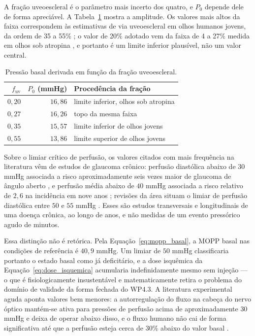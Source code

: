 A fração uveoescleral é o parâmetro mais incerto dos quatro, e $P_0$ depende dele de forma apreciável. A Tabela~\ref{tab:wp42_p0_fuv} mostra a amplitude. Os valores mais altos da faixa correspondem às estimativas de via uveoescleral em olhos humanos jovens, da ordem de 35 a 55\% \citep{alm2009}; o valor de 20\% adotado vem da faixa de 4 a 27\% medida em olhos sob atropina \citep{bill1971}, e portanto é um limite inferior plausível, não um valor central.

\begin{table}[h]
\centering
\caption{Pressão basal derivada em função da fração uveoescleral.}
\label{tab:wp42_p0_fuv}
\begin{tabular}{@{}rrl@{}}
\toprule
$f_{\mathrm{uv}}$ & $P_{0}$ (mmHg) & Procedência da fração \\
\midrule
$0{,}20$ & $16{,}86$ & limite inferior, olhos sob atropina \citep{bill1971} \\
$0{,}27$ & $16{,}26$ & topo da mesma faixa \\
$0{,}35$ & $15{,}57$ & limite inferior de olhos jovens \citep{alm2009} \\
$0{,}55$ & $13{,}86$ & limite superior de olhos jovens \citep{alm2009} \\
\bottomrule
\end{tabular}
\end{table}

Sobre o limiar crítico de perfusão, os valores citados com mais frequência na literatura vêm de estudos de glaucoma crônico: perfusão diastólica abaixo de $30$ mmHg associada a risco aproximadamente seis vezes maior de glaucoma de ângulo aberto \citep{tielsch1995}, e perfusão média abaixo de $40$ mmHg associada a risco relativo de $2{,}6$ na incidência em nove anos \citep{leske2008}; revisões da área situam o limiar de perfusão diastólica entre $50$ e $55$ mmHg \citep{leske2009}. Esses são estudos transversais e longitudinais de uma doença crônica, ao longo de anos, e não medidas de um evento pressórico agudo de minutos.

Essa distinção não é retórica. Pela Equação~\ref{eq:mopp_basal}, a MOPP basal nas condições de referência é $40{,}9$ mmHg. Um limiar de $50$ mmHg classificaria portanto o estado basal como já deficitário, e a dose isquêmica da Equação~\ref{eq:dose_isquemica} acumularia indefinidamente mesmo sem injeção --- o que é fisiologicamente insustentável e matematicamente retira o problema do domínio de validade da forma fechada do WP4.3. A literatura experimental aguda aponta valores bem menores: a autorregulação do fluxo na cabeça do nervo óptico mantém-se ativa para pressões de perfusão acima de aproximadamente $30$ mmHg e deixa de operar abaixo disso, e o fluxo humano não cai de forma significativa até que a perfusão esteja cerca de $30\%$ abaixo do valor basal \citep{nakakura2018}.

